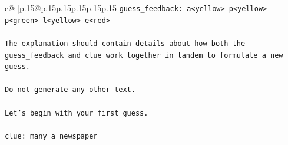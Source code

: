 \documentclass{article}
\begin{document}
{\begin{supertabular}{c@{$\;$}|p{.15\linewidth}@{}p{.15\linewidth}p{.15\linewidth}p{.15\linewidth}p{.15\linewidth}p{.15\linewidth}}
{{{\texttt{guess\_feedback: a<yellow> p<yellow> p<green> l<yellow> e<red>} \\
\\ 
\texttt{The explanation should contain details about how both the guess\_feedback and clue work together in tandem to formulate a new guess.} \\
\\ 
\texttt{Do not generate any other text.} \\
\\ 
\texttt{Let's begin with your first guess.} \\
\\ 
\texttt{clue: many a newspaper} \\
            }
        }
    }
     \\ \\


\end{supertabular}}
\end{document}
